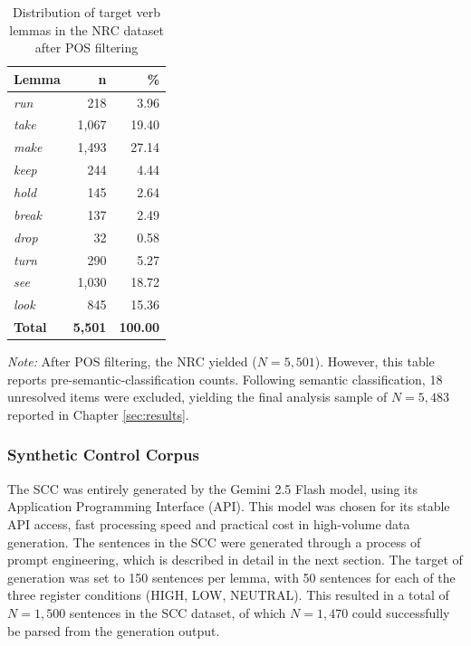 \documentclass[11pt,a4paper]{article}
\begin{document}
\begin{table}[htbp]
\centering
\caption[NRC Lemma Distribution]{Distribution of target verb lemmas in the NRC dataset after POS filtering} %
\label{tab:nrc-lemma-distribution}
\begin{tabular}{lrr}
\toprule
\textbf{Lemma} & \textbf{n} & \textbf{\%} \\
\midrule
\textit{run} & 218 & 3.96 \\
\textit{take} & 1{,}067 & 19.40 \\
\textit{make} & 1{,}493 & 27.14 \\
\textit{keep} & 244 & 4.44 \\
\textit{hold} & 145 & 2.64 \\
\textit{break} & 137 & 2.49 \\
\textit{drop} & 32 & 0.58 \\
\textit{turn} & 290 & 5.27 \\
\textit{see} & 1{,}030 & 18.72 \\
\textit{look} & 845 & 15.36 \\
\midrule
\textbf{Total} & \textbf{5{,}501} & \textbf{100.00} \\
\bottomrule
\end{tabular}

\vspace{1em}

\begin{minipage}{0.85\textwidth} %
\small \textit{Note:} After POS filtering, the NRC yielded ($N = 5{,}501$). However, this table reports pre-semantic-classification counts. Following semantic classification, 18 unresolved items were excluded, yielding the final analysis sample of $N = 5{,}483$ reported in Chapter \ref{sec:results}.
\end{minipage}
\end{table}

\subsubsection{Synthetic Control Corpus}\label{subsubsec:scc}

The SCC was entirely generated by the Gemini 2.5 Flash model, using its Application Programming Interface (API). This model was chosen for its stable API access, fast processing speed and practical cost in high-volume data generation. The sentences in the SCC were generated through a process of prompt engineering, which is described in detail in the next section. The target of generation was set to 150 sentences per lemma, with 50 sentences for each of the three register conditions (HIGH, LOW, NEUTRAL). This resulted in a total of $N=1{,}500$ sentences in the SCC dataset, of which $N=1{,}470$ could successfully be parsed from the generation output.
\end{document}
